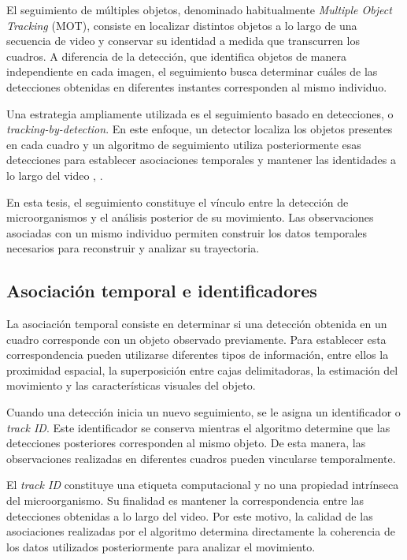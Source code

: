 El seguimiento de múltiples objetos, denominado habitualmente \textit{Multiple Object Tracking} (MOT), consiste en localizar distintos objetos a lo largo de una secuencia de video y conservar su identidad a medida que transcurren los cuadros. A diferencia de la detección, que identifica objetos de manera independiente en cada imagen, el seguimiento busca determinar cuáles de las detecciones obtenidas en diferentes instantes corresponden al mismo individuo.

Una estrategia ampliamente utilizada es el seguimiento basado en detecciones, o \textit{tracking-by-detection}. En este enfoque, un detector localiza los objetos presentes en cada cuadro y un algoritmo de seguimiento utiliza posteriormente esas detecciones para establecer asociaciones temporales y mantener las identidades a lo largo del video \cite{bewley2016}, \cite{zhang2022}.

En esta tesis, el seguimiento constituye el vínculo entre la detección de microorganismos y el análisis posterior de su movimiento. Las observaciones asociadas con un mismo individuo permiten construir los datos temporales necesarios para reconstruir y analizar su trayectoria.

\subsection{Asociación temporal e identificadores}

La asociación temporal consiste en determinar si una detección obtenida en un cuadro corresponde con un objeto observado previamente. Para establecer esta correspondencia pueden utilizarse diferentes tipos de información, entre ellos la proximidad espacial, la superposición entre cajas delimitadoras, la estimación del movimiento y las características visuales del objeto.

Cuando una detección inicia un nuevo seguimiento, se le asigna un identificador o \textit{track ID}. Este identificador se conserva mientras el algoritmo determine que las detecciones posteriores corresponden al mismo objeto. De esta manera, las observaciones realizadas en diferentes cuadros pueden vincularse temporalmente.

El \textit{track ID} constituye una etiqueta computacional y no una propiedad intrínseca del microorganismo. Su finalidad es mantener la correspondencia entre las detecciones obtenidas a lo largo del video. Por este motivo, la calidad de las asociaciones realizadas por el algoritmo determina directamente la coherencia de los datos utilizados posteriormente para analizar el movimiento.


